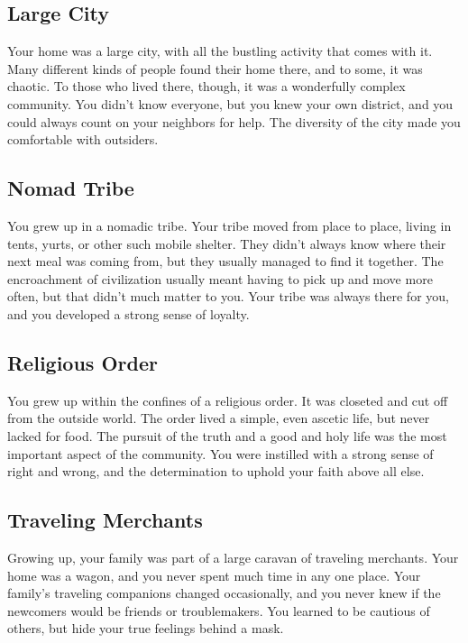 \begin{multicols}{2}
\subsection{Large City}

Your home was a large city, with all the bustling activity that comes
with it. Many different kinds of people found their home there, and
to some, it was chaotic. To those who lived there, though, it was a
wonderfully complex community. You didn't know everyone, but you knew
your own district, and you could always count on your neighbors for
help. The diversity of the city made you comfortable with outsiders.

\subsection{Nomad Tribe}

You grew up in a nomadic tribe. Your tribe moved from place to place,
living in tents, yurts, or other such mobile shelter. They didn't
always know where their next meal was coming from, but they usually
managed to find it together. The encroachment of civilization usually
meant having to pick up and move more often, but that didn't much
matter to you. Your tribe was always there for you, and you developed
a strong sense of loyalty.

\subsection{Religious Order}

You grew up within the confines of a religious order. It was closeted
and cut off from the outside world. The order lived a simple, even
ascetic life, but never lacked for food. The pursuit of the truth and
a good and holy life was the most important aspect of the community.
You were instilled with a strong sense of right and wrong, and the
determination to uphold your faith above all else.

\subsection{Traveling Merchants}

Growing up, your family was part of a large caravan of traveling merchants.
Your home was a wagon, and you never spent much time in any one place.
Your family's traveling companions changed occasionally, and you never
knew if the newcomers would be friends or troublemakers. You learned to
be cautious of others, but hide your true feelings behind a mask.


\end{multicols}
